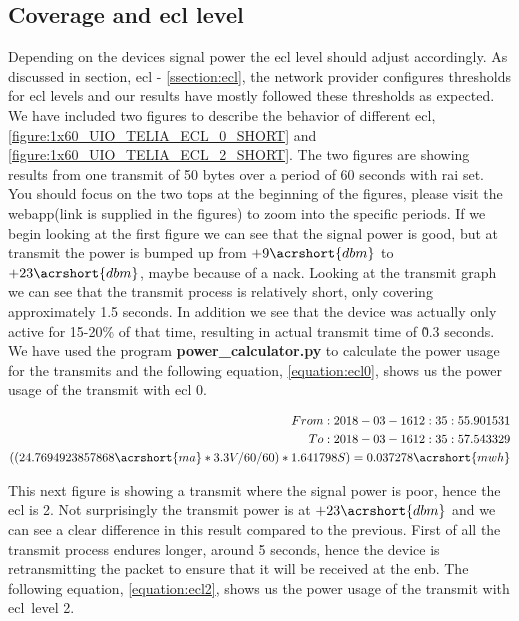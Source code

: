 \documentclass[USenglish]{ifimaster}  %
\begin{document}
\subsection{Coverage and \acrshort{ecl} level} \label{ssection:ecltest}
Depending on the devices signal power the \acrshort{ecl} level should adjust accordingly. As discussed in section, \acrshort{ecl} - \vref{ssection:ecl}, the network provider configures thresholds for \acrshort{ecl} levels and our results have mostly followed these thresholds as expected. We have included two figures to describe the behavior of different \acrshort{ecl}, \vref{figure:1x60_UIO_TELIA_ECL_0_SHORT} and \vref{figure:1x60_UIO_TELIA_ECL_2_SHORT}.
The two figures are showing results from one transmit of 50 bytes over a period of 60 seconds with \acrshort{rai} set. You should focus on the two tops at the beginning of the figures, please visit the webapp(link is supplied in the figures) to zoom into the specific periods. If we begin looking at the first figure we can see that the signal power is good, but at transmit the power is bumped up from ${+9 \acrshort{dbm}}$ to ${+23 \acrshort{dbm}}$, maybe because of a \acrshort{nack}. Looking at the transmit graph we can see that the transmit process is relatively short, only covering approximately 1.5 seconds.
In addition we see that the device was actually only active for 15-20\% of that time, resulting in actual transmit time of \~0.3 seconds. We have used the program \textbf{power\_calculator.py} to calculate the power usage for the transmits and the following equation, \vref{equation:ecl0}, shows us the power usage of the transmit with \acrshort{ecl} 0.

\begin{equation} \label{equation:ecl0}
\begin{aligned}
From: 2018-03-16 12:35:55.901531 \\
To: 2018-03-16 12:35:57.543329 \\
((24.7694923857868\acrshort{ma} * 3.3V / 60 / 60 ) * 1.641798S) = 0.037278\acrshort{mwh} \\
\end{aligned}
\end{equation}

This next figure is showing a transmit where the signal power is poor, hence the \acrshort{ecl} is 2. Not surprisingly the transmit power is at ${+23 \acrshort{dbm}}$ and we can see a clear difference in this result compared to the previous. First of all the transmit process endures longer, around 5 seconds, hence the device is retransmitting the packet to ensure that it will be received at the \acrshort{enb}. The following equation, \vref{equation:ecl2}, shows us the power usage of the transmit with \acrshort{ecl} level 2.
\end{document}
